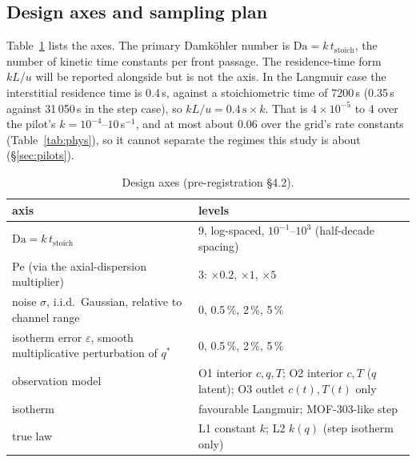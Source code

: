 \documentclass[11pt]{article}
\newcommand{\Da}{\mathrm{Da}}
\newcommand{\Pe}{\mathrm{Pe}}
\newcommand{\qs}{q^{*}}
\begin{document}
\subsection{Design axes and sampling plan}
\label{sec:axes}
Table~\ref{tab:axes} lists the axes. The primary Damk\"ohler number is
$\Da = k\,t_{\mathrm{stoich}}$, the number of kinetic time constants per front passage. The
residence-time form $kL/u$ will be reported alongside but is not the axis. In the Langmuir
case the interstitial residence time is 0.4\,s, against a stoichiometric time of 7200\,s
(0.35\,s against 31\,050\,s in the step case), so $kL/u = 0.4\,\mathrm{s}\times k$. That is
$4\times10^{-5}$ to 4 over the pilot's $k = 10^{-4}$--$10$\,s$^{-1}$, and at most about 0.06
over the grid's rate constants (Table~\ref{tab:phys}), so it cannot separate the regimes
this study is about (\S\ref{sec:pilots}).
\begin{table}[t]
\centering
\caption{Design axes (pre-registration \S4.2).}
\label{tab:axes}
\begin{tabularx}{\textwidth}{>{\raggedright\arraybackslash}p{4.2cm}X}
\toprule
axis & levels \\
\midrule
$\Da = k\,t_{\mathrm{stoich}}$ & 9, log-spaced, $10^{-1}$--$10^{3}$ (half-decade spacing) \\
$\Pe$ (via the axial-dispersion multiplier) & 3: $\times 0.2$, $\times 1$, $\times 5$ \\
noise $\sigma$, i.i.d.\ Gaussian, relative to channel range & 0, 0.5\,\%, 2\,\%, 5\,\% \\
isotherm error $\varepsilon$, smooth multiplicative perturbation of $\qs$ & 0, 0.5\,\%, 2\,\%, 5\,\% \\
observation model & O1 interior $c,q,T$; O2 interior $c,T$ ($q$ latent); O3 outlet $c(t),T(t)$ only \\
isotherm & favourable Langmuir; MOF-303-like step \\
true law & L1 constant $k$; L2 $k(q)$ (step isotherm only) \\
\bottomrule
\end{tabularx}
\end{table}
\end{document}
